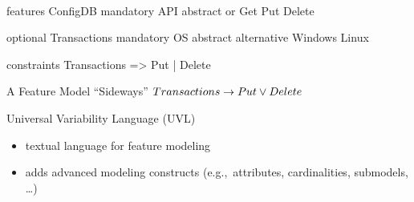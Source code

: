 \begin{frame}[fragile]{\myframetitle\ \mytitlesource{\uvlwebsite}}
	\begin{mycolumns}
\begin{uvltight}[basicstyle=\normalsize]{}
features
	ConfigDB
		mandatory
			API {abstract}
				or
					Get
					Put
					Delete

		optional
			Transactions
		mandatory
			OS {abstract}
				alternative
					Windows
					Linux

constraints
	Transactions => Put | Delete
\end{uvltight}
	\mynextcolumn
		\begin{exampletight}{A Feature Model ``Sideways''}
			\centering
			$Transactions \rightarrow Put \vee Delete$
		\end{exampletight}
		\begin{note}{Universal Variability Language (UVL)}
			\begin{itemize}
				\item textual language for feature modeling
				\item adds advanced modeling constructs (e.g.,~attributes, cardinalities, submodels, \ldots)
			\end{itemize}
		\end{note}
	\end{mycolumns}
\end{frame}

